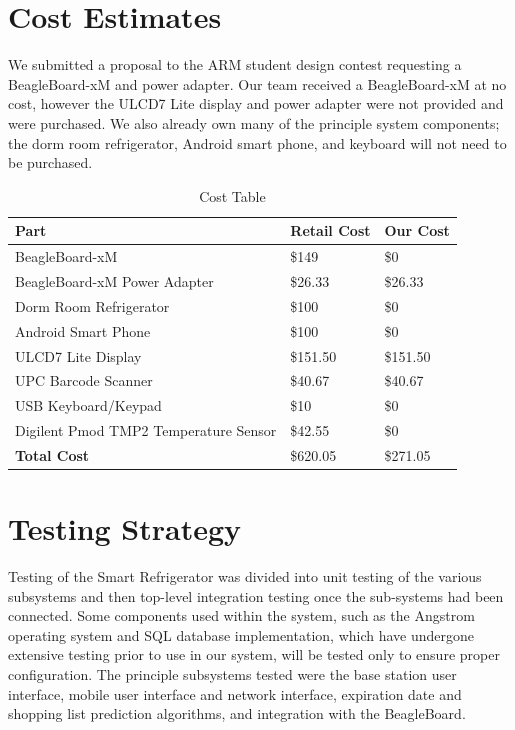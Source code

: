 \documentclass[11pt]{article} %
\begin{document}
\section{Cost Estimates}
We submitted a proposal to the ARM student design contest requesting a BeagleBoard-xM and power adapter. Our team received a BeagleBoard-xM at no cost, however the ULCD7 Lite display and power adapter were not provided and were purchased. We also already own many of the principle system components; the dorm room refrigerator, Android smart phone, and keyboard will not need to be purchased.
\begin{table}[h!]
\vspace{0.5cm}
\begin{center}
\caption{Cost Table}
\label{tab:cost}
\begin{tabular}{| p{3.0in} | p{1.5in} |p{1.5in} |}
\hline
Part & Retail Cost & Our Cost \\
\hline
BeagleBoard-xM & \$149 & \$0 \\
\hline
BeagleBoard-xM Power Adapter & \$26.33 & \$26.33 \\
\hline
Dorm Room Refrigerator & \$100 & \$0 \\
\hline
Android Smart Phone & \$100 & \$0  \\
\hline
ULCD7 Lite Display & \$151.50  & \$151.50 \\
\hline
UPC Barcode Scanner & \$40.67 & \$40.67 \\
\hline
USB Keyboard/Keypad & \$10 & \$0 \\
\hline
Digilent Pmod TMP2 Temperature Sensor & \$42.55 & \$0 \\
\hline
\hline
\textbf{Total Cost} & \$620.05 & \$271.05 \\
\hline
\end{tabular}
\end{center}
\end{table}

\section{Testing Strategy}
Testing of the Smart Refrigerator was divided into unit testing of the various subsystems and then top-level integration testing once the sub-systems had been connected. Some components used within the system, such as the Angstrom operating system and SQL database implementation, which have undergone extensive testing prior to use in our system, will be tested only to ensure proper configuration. The principle subsystems tested were the base station user interface, mobile user interface and network interface, expiration date and shopping list prediction algorithms, and integration with the BeagleBoard.
\end{document}
